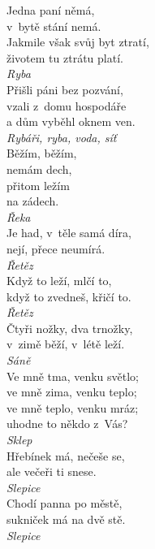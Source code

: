 \begin{multicols}{4}
\noindent
Jedna paní němá,\\
v~bytě stání nemá.\\
Jakmile však svůj byt ztratí,\\
životem tu ztrátu platí.\\[1 mm]
{\sl Ryba}\\

\noindent
Přišli páni bez pozvání,\\
vzali z~domu hospodáře\\
a dům vyběhl oknem ven.\\[1 mm]
{\sl Rybáři, ryba, voda, síť}\\

\noindent
Běžím, běžím,\\
nemám dech,\\
přitom ležím\\
na zádech.\\[1 mm]
{\sl Řeka}\\

\noindent
Je had, v~těle samá díra,\\
nejí, přece neumírá.\\[1 mm]
{\sl Řetěz}\\

\noindent
Když to leží, mlčí to,\\
když to zvedneš, křičí to.\\[1 mm]
{\sl Řetěz}\\

\noindent
Čtyři nožky, dva trnožky,\\
v~zimě běží, v~létě leží.\\[1 mm]
{\sl Sáně}\\

\noindent
Ve mně tma, venku světlo;\\
ve mně zima, venku teplo;\\
ve mně teplo, venku mráz;\\
uhodne to někdo z~Vás?\\[1 mm]
{\sl Sklep}\\

\noindent
Hřebínek má, nečeše se,\\
ale večeři ti snese.\\[1 mm]
{\sl Slepice}\\

\noindent
Chodí panna po městě,\\
sukniček má na dvě stě.\\[1 mm]
{\sl Slepice}\\


\end{multicols}
